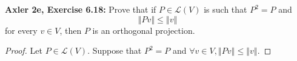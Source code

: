 \documentclass{article}
\newcommand{\norm}[1]{\left\Vert #1 \right\Vert}
\begin{document}
\newpage %


\textbf{Axler 2e, Exercise 6.18: }
Prove that if $P \in \mathcal{L}(V)$ is such that $P^2 = P$ and
$$\norm{Pv} \le \norm{v}$$
for every $v \in V$, then $P$ is an orthogonal projection.

\begin{proof}
    Let $P \in \mathcal{L}(V)$. Suppose that $P^2 = P$ and $\forall v \in V, \norm{Pv} \le \norm{ v}$.
\end{proof}
\end{document}

